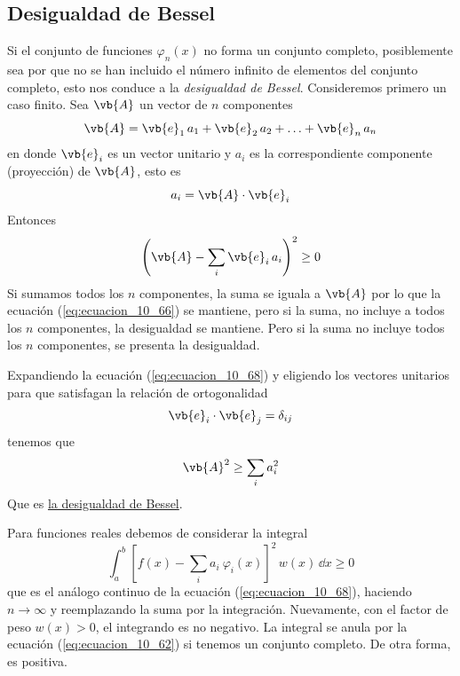 \subsection{Desigualdad de Bessel}
Si el conjunto de funciones $\varphi_{n} (x)$ no forma un conjunto completo, posiblemente sea por que no se han incluido el número infinito de elementos del conjunto completo, esto nos conduce a la \emph{desigualdad de Bessel}. Consideremos primero un caso finito. Sea $\vb{A}$ un vector de $n$ componentes
\begin{equation}
\vb{A} = \vb{e}_{1} \, a_{1} + \vb{e}_{2} \, a_{2} + \ldots + \vb{e}_{n} \, a_{n} 
\label{eq:ecuacion_10_66}
\end{equation}
en donde $\vb{e}_{i}$ es un vector unitario y $a_{i}$ es la correspondiente componente (proyección) de $\vb{A}$, esto es
\begin{equation}
a_{i} = \vb{A} \cdot \vb{e}_{i}
\label{eq:ecuacion_10_67}
\end{equation}
Entonces
\begin{equation}
\left( \vb{A} - \sum_{i} \vb{e}_{i} \, a_{i} \right)^{2} \geq 0
\label{eq:ecuacion_10_68}
 \end{equation}
Si sumamos todos los $n$ componentes, la suma se iguala a $\vb{A}$ por lo que la ecuación (\ref{eq:ecuacion_10_66}) se mantiene, pero si la suma, no incluye a todos los $n$ componentes, la desigualdad se mantiene. Pero si la suma no incluye todos los $n$ componentes, se presenta la desigualdad.
\par
Expandiendo la ecuación (\ref{eq:ecuacion_10_68}) y eligiendo los vectores unitarios para que satisfagan la relación de ortogonalidad
\begin{equation}
\vb{e}_{i} \cdot \vb{e}_{j} =  \delta_{ij}
\label{eq:ecuacion_10_69}
\end{equation}
tenemos que
\begin{equation}
\vb{A}^{2} \geq \sum_{i} a_{i}^{2}
\label{eq:ecuacion_10_70}
\end{equation}
Que es \underline{la desigualdad de Bessel}.
\par
Para funciones reales debemos de considerar la integral
\begin{equation}
\int_{a}^{b} \left[ f(x) - \sum_{i} a_{i} \: \varphi_{i}(x) \right]^{2} \, w(x) \, \dd{x} \geq 0
\label{eq:ecuacion_10_71}
\end{equation}
que es el análogo continuo de la ecuación (\ref{eq:ecuacion_10_68}), haciendo $n \to \infty$ y reemplazando la suma por la integración. Nuevamente, con el factor de peso $w(x) > 0 $, el integrando es no negativo. La integral se anula por la ecuación (\ref{eq:ecuacion_10_62}) si tenemos un conjunto completo. De otra forma, es positiva.

